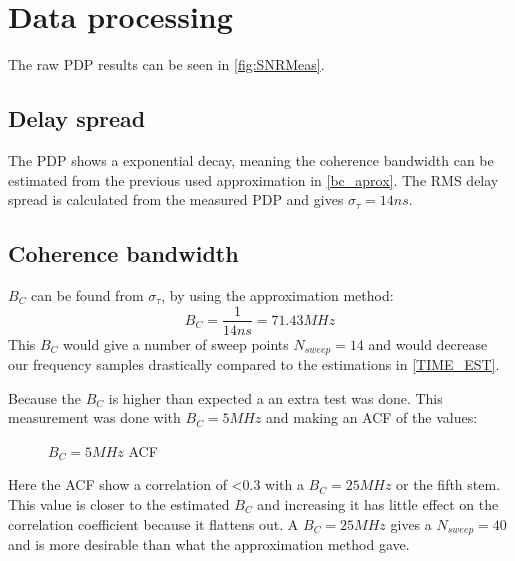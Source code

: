\section{Data processing}
The raw PDP results can be seen in  \autoref{fig:SNRMeas}.
\subsection{Delay spread}
The PDP shows a exponential decay, meaning the coherence bandwidth can be estimated from the previous used approximation in \autoref{bc_aprox}. The RMS delay spread is calculated from the measured PDP and gives $\sigma_{\tau} = 14ns$.

\subsection{Coherence bandwidth}\label{sec:coherence_bandwidth}

$B_C$ can be found from $\sigma_{\tau}$, by using the approximation method:
\begin{equation}
B_C = \frac{1}{14ns} = 71.43 MHz 
\end{equation}
This $B_C$ would give a number of sweep points $N_{sweep} = 14$ and would decrease our  frequency samples drastically compared to the estimations in \autoref{TIME_EST}.

Because the $B_C$ is higher than expected a 
an extra test was done. This measurement was done with $B_C = 5MHz$ and making an \gls{ACF} of the values:

\begin{figure}[H]
\centering

\caption{$B_C = 5MHz$ \gls{ACF}} 
\label{fig:coh_test}
\end{figure}

Here the \gls{ACF} show a correlation of <0.3 with a $B_C = 25MHz$ or the fifth stem. This value is closer to the estimated $B_C$ and increasing it has little effect on the correlation coefficient because it flattens out. A $B_C = 25MHz$ gives a $N_{sweep} = 40$ and is more desirable than what the approximation method gave.

